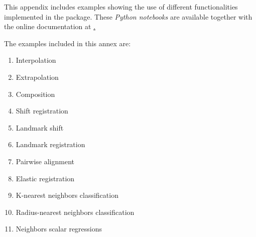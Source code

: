 

This appendix includes examples showing the use of different functionalities
implemented in the package. These \textit{Python notebooks} are available
together with the online documentation at
\href{https://fda.readthedocs.io/en/latest/auto_examples/}.

The examples included in this annex are:

\begin{enumerate}
\item Interpolation
\item Extrapolation
\item Composition
\item Shift registration
\item Landmark shift
\item Landmark registration
\item Pairwise alignment
\item Elastic registration
\item K-nearest neighbors classification
\item Radius-nearest neighbors classification
\item Neighbors scalar regressions

\end{enumerate}













